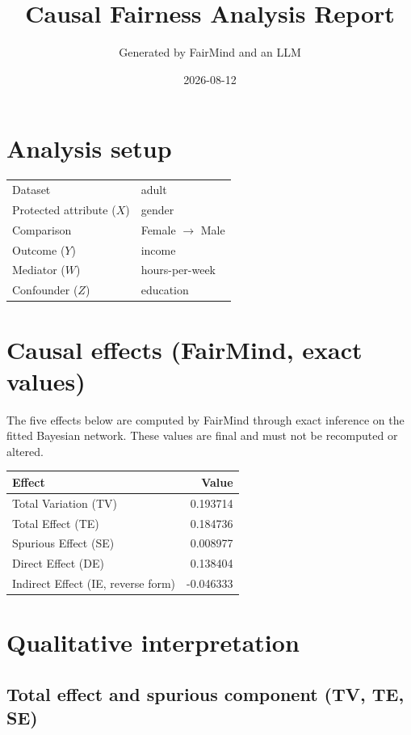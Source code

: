 \documentclass[11pt]{article}
\title{Causal Fairness Analysis Report}
\author{Generated by FairMind and an LLM}
\date{2026-08-12}
\begin{document}
\maketitle

\section{Analysis setup}

\begin{tabular}{ll}
\toprule
Dataset & adult \\
Protected attribute ($X$) & gender \\
Comparison & Female $\to$ Male \\
Outcome ($Y$) & income \\
Mediator ($W$) & hours-per-week \\
Confounder ($Z$) & education \\
\bottomrule
\end{tabular}

\section{Causal effects (FairMind, exact values)}

The five effects below are computed by FairMind through exact inference on the
fitted Bayesian network. These values are final and must not be recomputed or
altered.

\begin{tabular}{lr}
\toprule
Effect & Value \\
\midrule
Total Variation (TV) & 0.193714 \\
Total Effect (TE) & 0.184736 \\
Spurious Effect (SE) & 0.008977 \\
Direct Effect (DE) & 0.138404 \\
Indirect Effect (IE, reverse form) & -0.046333 \\
\bottomrule
\end{tabular}

\section{Qualitative interpretation}

\subsection{Total effect and spurious component (TV, TE, SE)}
\end{document}
